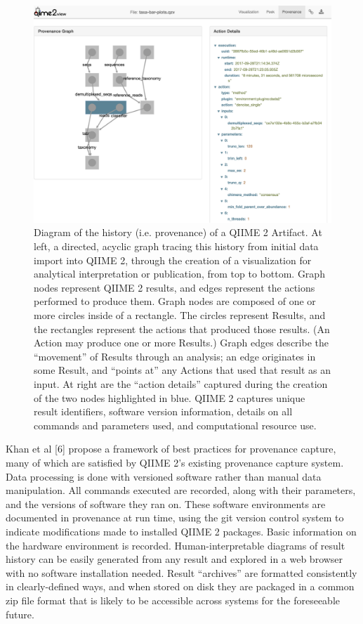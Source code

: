 \begin{figure}[htp]
\centering
\includegraphics[width=\textwidth]{figures/provenance_graph.png}
\caption[Diagram of the history (provenance) of a QIIME 2 Artifact]%
{Diagram of the history (i.e. provenance) of a QIIME 2 Artifact. At left, a
directed, acyclic graph tracing this history from initial data import into QIIME
2, through the creation of a visualization for analytical interpretation or
publication, from top to bottom. Graph nodes represent QIIME 2 results, and
edges represent the actions performed to produce them. Graph nodes are composed
of one or more circles inside of a rectangle. The circles represent Results, and
the rectangles represent the actions that produced those results. (An Action may
produce one or more Results.) Graph edges describe the “movement” of Results
through an analysis; an edge originates in some Result, and “points at” any
Actions that used that result as an input. At right are the “action details”
captured during the creation of the two nodes highlighted in blue. QIIME 2
captures unique result identifiers, software version information, details on all
commands and parameters used, and computational resource use.}
\label{fig:provenance_graph}
\end{figure}

Khan et al [6] propose a framework of best practices for provenance capture,
many of which are satisfied by QIIME 2’s existing provenance capture system.
Data processing is done with versioned software rather than manual data
manipulation. All commands executed are recorded, along with their parameters,
and the versions of software they ran on. These software environments are
documented in provenance at run time, using the git version control system to
indicate modifications made to installed QIIME 2 packages. Basic information on
the hardware environment is recorded. Human-interpretable diagrams of result
history can be easily generated from any result and explored in a web browser
with no software installation needed. Result “archives” are formatted
consistently in clearly-defined ways, and when stored on disk they are packaged
in a common zip file format that is likely to be accessible across systems for
the foreseeable future.

